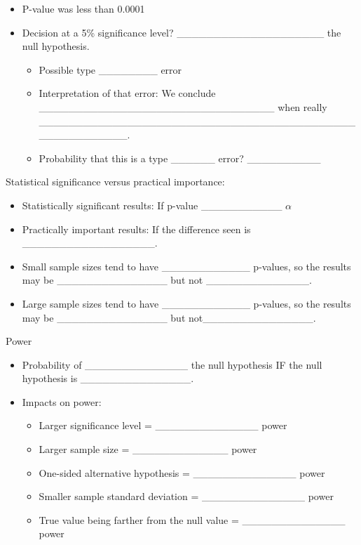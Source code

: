 \documentclass[
]{report}
\begin{document}

\begin{itemize}
\item
  P-value was less than 0.0001
\item
  Decision at a 5\% significance level? \_\_\_\_\_\_\_\_\_\_\_\_\_\_\_\_\_\_\_\_ the null hypothesis.

  \begin{itemize}
  \item
    Possible type \_\_\_\_\_\_\_\_ error
  \item
    Interpretation of that error: We conclude \_\_\_\_\_\_\_\_\_\_\_\_\_\_\_\_\_\_\_\_\_\_\_\_\_\_\_\_\_\_\_\_ when really \_\_\_\_\_\_\_\_\_\_\_\_\_\_\_\_\_\_\_\_\_\_\_\_\_\_\_\_\_\_\_\_\_\_\_\_\_\_\_\_\_\_\_\_\_\_\_\_\_\_\_\_\_\_\_.
  \item
    Probability that this is a type \_\_\_\_\_\_ error? \_\_\_\_\_\_\_\_\_\_
  \end{itemize}
\end{itemize}

Statistical significance versus practical importance:

\begin{itemize}
\item
  Statistically significant results: If p-value \_\_\_\_\_\_\_\_\_\_\_ \(\alpha\)
\item
  Practically important results: If the difference seen is \_\_\_\_\_\_\_\_\_\_\_\_\_\_\_\_\_\_.
\item
  Small sample sizes tend to have \_\_\_\_\_\_\_\_\_\_\_\_ p-values, so the results may be \_\_\_\_\_\_\_\_\_\_\_\_\_\_\_ but not \_\_\_\_\_\_\_\_\_\_\_\_\_\_.
\item
  Large sample sizes tend to have \_\_\_\_\_\_\_\_\_\_\_\_ p-values, so the results may be \_\_\_\_\_\_\_\_\_\_\_\_\_\_\_ but not\_\_\_\_\_\_\_\_\_\_\_\_\_\_\_.
\end{itemize}

Power

\begin{itemize}
\item
  Probability of \_\_\_\_\_\_\_\_\_\_\_\_\_\_ the null hypothesis IF the null hypothesis is \_\_\_\_\_\_\_\_\_\_\_\_\_\_\_.
\item
  Impacts on power:

  \begin{itemize}
  \item
    Larger significance level = \_\_\_\_\_\_\_\_\_\_\_\_\_\_ power
  \item
    Larger sample size = \_\_\_\_\_\_\_\_\_\_\_\_\_ power
  \item
    One-sided alternative hypothesis = \_\_\_\_\_\_\_\_\_\_\_\_\_\_ power
  \item
    Smaller sample standard deviation = \_\_\_\_\_\_\_\_\_\_\_\_\_\_ power
  \item
    True value being farther from the null value = \_\_\_\_\_\_\_\_\_\_\_\_\_\_ power
  \end{itemize}
\end{itemize}
\end{document}
